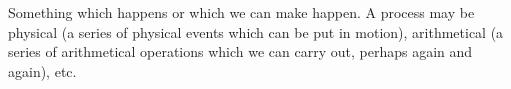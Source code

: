 Something which happens or which we can make happen. A process may be
physical (a series of physical events which can be put in motion), 
arithmetical (a series of arithmetical operations which we can carry out,
perhaps again and again), etc.
